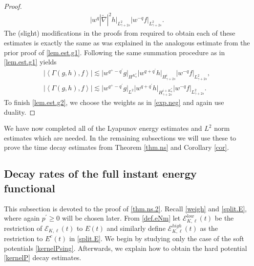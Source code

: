 \documentclass{amsart}
\numberwithin{equation}{section}
\begin{document}
\begin{proof}
\begin{gather*}
  {|} w^{q} |\tilde{\nabla}|^2 h {|}_{L^2_{\gamma+2s}}
  {|} w^{-{q}} f{|}_{L^2_{\gamma+2s}}.
  \label{cancelh2g2}
\end{gather*}
The (slight) modifications in the proofs from \cite{gsNonCut0} required to obtain each of these estimates is exactly the same as was explained in the analogous estimate from the prior proof of \eqref{lem.est.g1}.   Following the same summation procedure as in \eqref{lem.est.g1} yields
\begin{gather*}
\left| { \left< {{\Gamma(g,h),f}} \right> } \right|
\lesssim
{|} w^{ {q}^+ - {q}^\prime}  g{|}_{H^{K^*_n}}  
{|} w^{ {q} + {q}^\prime}  h{|}_{H^{i}_{\gamma+2s}}
{|} w^{ -{q}}  f{|}_{L^2_{\gamma+2s}},
\\
\left| { \left< {{\Gamma(g,h),f}} \right> } \right|
\lesssim
{|} w^{ {q}^+ - {q}^\prime}  g{|}_{L^2}  
{|} w^{ {q} + {q}^\prime}  h{|}_{H^{{i}+{K^*_n}}_{\gamma+2s}}
{|} w^{ -{q}}  f{|}_{L^2_{\gamma+2s}}.
\end{gather*}
To finish \eqref{lem.est.g2}, we choose the weights as in \eqref{exp.neg} and again use duality.
\end{proof}

We have now completed all of the Lyapunov energy estimates and $L^2$ norm estimates which are needed.  In the remaining subsections we will use these to prove the time decay estimates from Theorem \ref{thm.ns} and Corollary \ref{cor}.

\subsection{Decay rates of the full instant energy functional}\label{sec.decayNL.1}
This subsection is devoted to the proof of \eqref{thm.ns.2}.  
Recall \eqref{weigh} and \eqref{split.E}, where again $p^\prime\ge 0$ will be chosen later.   From \eqref{def.eNm} let 
${\mathcal{E}}_{{K},{\ell}}^{low}(t)$ be the restriction of ${\mathcal{E}}_{{K},{\ell}}(t)$ to $E(t)$ and similarly define 
${\mathcal{E}}_{{K},{\ell}}^{high}(t)$ as the restriction to  $E^c(t)$ in \eqref{split.E}.  We begin by studying only the case of the soft potentials \eqref{kernelPsing}.  Afterwards, we explain how to obtain the hard potential \eqref{kernelP} decay estimates.
\end{document}
